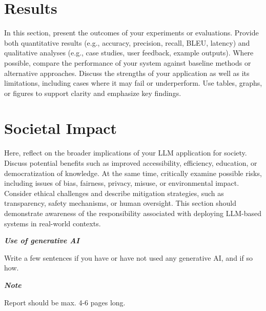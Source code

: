 \documentclass[a4paper,10pt]{article}
\begin{document}
\section{Results}
In this section, present the outcomes of your experiments or evaluations. Provide both quantitative results (e.g., accuracy, precision, recall, BLEU, latency) and qualitative analyses (e.g., case studies, user feedback, example outputs). Where possible, compare the performance of your system against baseline methods or alternative approaches. Discuss the strengths of your application as well as its limitations, including cases where it may fail or underperform. Use tables, graphs, or figures to support clarity and emphasize key findings.

\section{Societal Impact}
Here, reflect on the broader implications of your LLM application for society. Discuss potential benefits such as improved accessibility, efficiency, education, or democratization of knowledge. At the same time, critically examine possible risks, including issues of bias, fairness, privacy, misuse, or environmental impact. Consider ethical challenges and describe mitigation strategies, such as transparency, safety mechanisms, or human oversight. This section should demonstrate awareness of the responsibility associated with deploying LLM-based systems in real-world contexts.

	
\hfill \break
\textit{\textbf{Use of generative AI}}

Write a few sentences if you have or have not used any generative AI, and if so how.


\hfill \break
\textit{\textbf{Note}}

Report should be max. 4-6 pages long.

	
\begin{thebibliography}{1}

		
\end{thebibliography}

	
	
%	
%	
%	
\end{document}
